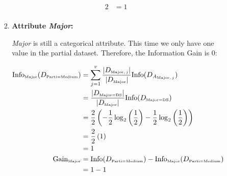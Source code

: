 \documentclass[
english,
smallborders
]{i6prcsht}
\newcommand{\OfSpecificValue}[3]{_{\text{\tiny #1#2#3}}}
\newcommand{\OfAttribute}[1]{_{\text{\tiny #1}}}
\begin{document}
\begin{solution}
\begin{enumerate}
\begin{enumerate}
\begin{enumerate}
\begin{enumerate}
\begin{alignat*}{2}
						                                                                                          & = 1                                                                                                                                                                                                                                     \\
					                        \end{alignat*}

					                  \item \textbf{Attribute \textit{Major}:}

					                        \textit{Major} is still a categorical attribute. This time we only have one value in the partial dataset. Therefore, the Information Gain is $0$:

					                        \begin{alignat*}{2}
						                        \text{Info}\OfAttribute{Major}(D\OfSpecificValue{Parti}{=}{Medium}) & = \sum_{j=1}^v \frac{|D\OfAttribute{Major$,j$}|}{|D\OfAttribute{Major}|} \text{Info}(D_{A\OfAttribute{Major$,j$}})       \\
						                                                                                            & = \frac{|D\OfSpecificValue{Major}{=}{DS}|}{|D\OfAttribute{Major}|} \text{Info}(D\OfSpecificValue{Major}{=}{DS})          \\
						                                                                                            & = \frac{2}{2} \left(-\frac{1}{2} \log_2\left(\frac{1}{2}\right) - \frac{1}{2} \log_2\left(\frac{1}{2}\right)\right)      \\
						                                                                                            & = \frac{2}{2} \left(1\right)                                                                                             \\
						                                                                                            & = 1                                                                                                                      \\
						                        \text{Gain}\OfAttribute{Major}                                      & = \text{Info}(D\OfSpecificValue{Parti}{=}{Medium}) - \text{Info}\OfAttribute{Major}(D\OfSpecificValue{Parti}{=}{Medium}) \\
						                                                                                            & = 1 - 1                                                                                                                  \\

\end{alignat*}
\end{enumerate}
\end{enumerate}
\end{enumerate}
\end{enumerate}
\end{solution}
\end{document}
